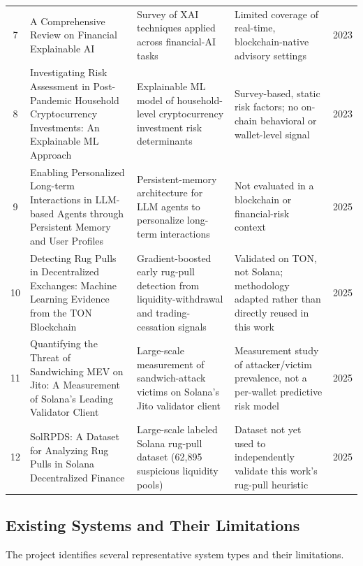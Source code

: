 \documentclass[conference]{IEEEtran}
\begin{document}
\begin{table}[t]
\begin{tabularx}{\textwidth}{c X X X c}
7 & A Comprehensive Review on Financial Explainable AI &
Survey of XAI techniques applied across financial-AI tasks &
Limited coverage of real-time, blockchain-native advisory settings &
2023\\

8 & Investigating Risk Assessment in Post-Pandemic Household Cryptocurrency Investments: An Explainable ML Approach &
Explainable ML model of household-level cryptocurrency investment risk determinants &
Survey-based, static risk factors; no on-chain behavioral or wallet-level signal &
2023\\

9 & Enabling Personalized Long-term Interactions in LLM-based Agents through Persistent Memory and User Profiles &
Persistent-memory architecture for LLM agents to personalize long-term interactions &
Not evaluated in a blockchain or financial-risk context &
2025\\

10 & Detecting Rug Pulls in Decentralized Exchanges: Machine Learning Evidence from the TON Blockchain &
Gradient-boosted early rug-pull detection from liquidity-withdrawal and trading-cessation signals &
Validated on TON, not Solana; methodology adapted rather than directly reused in this work &
2025\\

11 & Quantifying the Threat of Sandwiching MEV on Jito: A Measurement of Solana's Leading Validator Client &
Large-scale measurement of sandwich-attack victims on Solana's Jito validator client &
Measurement study of attacker/victim prevalence, not a per-wallet predictive risk model &
2025\\

12 & SolRPDS: A Dataset for Analyzing Rug Pulls in Solana Decentralized Finance &
Large-scale labeled Solana rug-pull dataset (62{,}895 suspicious liquidity pools) &
Dataset not yet used to independently validate this work's rug-pull heuristic &
2025\\

\bottomrule
\end{tabularx}
\end{table}

\subsection{Existing Systems and Their Limitations}

The project identifies several representative system types and their limitations.
\end{document}
